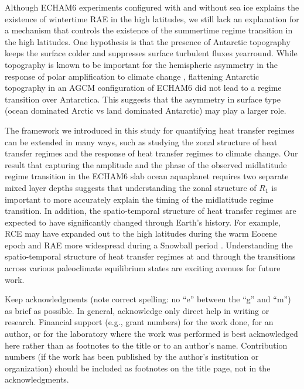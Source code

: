 \documentclass{ametsocV5}
\begin{document}
Although ECHAM6 experiments configured with and without sea ice explains the existence of wintertime RAE in the high latitudes, we still lack an explanation for a mechanism that controls the existence of the summertime regime transition in the high latitudes. One hypothesis is that the presence of Antarctic topography keeps the surface colder and suppresses surface turbulent fluxes yearround. While topography is known to be important for the hemispheric asymmetry in the response of polar amplification to climate change \citep{salzmann2017,hahn2020,singh2020}, flattening Antarctic topography in an AGCM configuration of ECHAM6 did not lead to a regime transition over Antarctica. This suggests that the asymmetry in surface type (ocean dominated Arctic vs land dominated Antarctic) may play a larger role.

The framework we introduced in this study for quantifying heat transfer regimes can be extended in many ways, such as studying the zonal structure of heat transfer regimes and the response of heat transfer regimes to climate change. Our result that capturing the amplitude and the phase of the observed midlatitude regime transition in the ECHAM6 slab ocean aquaplanet requires two separate mixed layer depths suggests that understanding the zonal structure of $R_1$ is important to more accurately explain the timing of the midlatitude regime transition. In addition, the spatio-temporal structure of heat transfer regimes are expected to have significantly changed through Earth's history. For example, RCE may have expanded out to the high latitudes during the warm Eocene epoch \citep{abbot2008a} and RAE more widespread during a Snowball period \citep{pierrehumbert2005}. Understanding the spatio-temporal structure of heat transfer regimes at and through the transitions across various paleoclimate equilibrium states are exciting avenues for future work.

\acknowledgments
Keep acknowledgments (note correct spelling: no ``e'' between the ``g'' and
``m'') as brief as possible. In general, acknowledge only direct help in
writing or research. Financial support (e.g., grant numbers) for the work
done, for an author, or for the laboratory where the work was performed is
best acknowledged here rather than as footnotes to the title or to an
author's name. Contribution numbers (if the work has been published by the
author's institution or organization) should be included as footnotes on the title page,
not in the acknowledgments.
\end{document}
